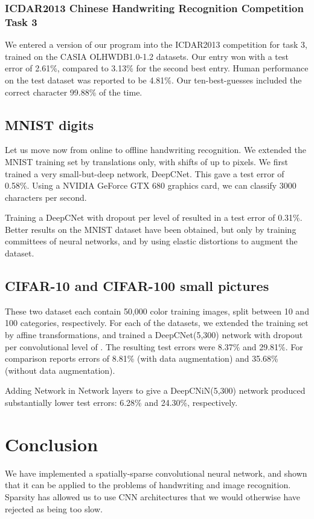 \documentclass{article}
\numberwithin{equation}{subsection}
\begin{document}
\subsubsection{ICDAR2013 Chinese Handwriting Recognition Competition Task 3}
We entered a version of our program into the ICDAR2013 competition for task 3, trained on the CASIA OLHWDB1.0-1.2 datasets. Our entry won with a test error of 2.61\%, compared to 3.13\% for the second best entry. Human performance on the test dataset was reported to be 4.81\%. Our ten-best-guesses included the correct character 99.88\% of the time.



\subsection{MNIST digits}\label{mnist}
Let us move now from online to offline handwriting recognition. We extended the MNIST training set by translations only, with shifts of up to  pixels. We first trained a very small-but-deep network, DeepCNet.  This gave a test error of 0.58\%. Using a NVIDIA GeForce GTX 680 graphics card, we can classify 3000 characters per second.


Training a DeepCNet with dropout per level of  resulted in a test error of 0.31\%.
Better results on the MNIST dataset have been obtained, but only by training committees of neural networks, and by using elastic distortions to augment the dataset.

\subsection{CIFAR-10 and CIFAR-100 small pictures}
These two dataset each contain 50,000  color training images, split between 10 and 100 categories, respectively. For each of the datasets, we extended the training set by affine transformations, and trained a DeepCNet(5,300) network with dropout per convolutional level of .
The resulting test errors were 8.37\% and 29.81\%. For comparison \cite{NetworkInNetwork} reports errors of 8.81\% (with data augmentation) and 35.68\% (without data augmentation).

Adding Network in Network layers to give a DeepCNiN(5,300) network produced substantially lower test errors:  6.28\% and 24.30\%, respectively.






\section{Conclusion}\label{sec:conclusion}
We have implemented a spatially-sparse convolutional neural network, and shown that it can be applied to the problems of handwriting and image recognition. Sparsity has allowed us to use CNN architectures that we would otherwise have rejected as being too slow.
\end{document}

